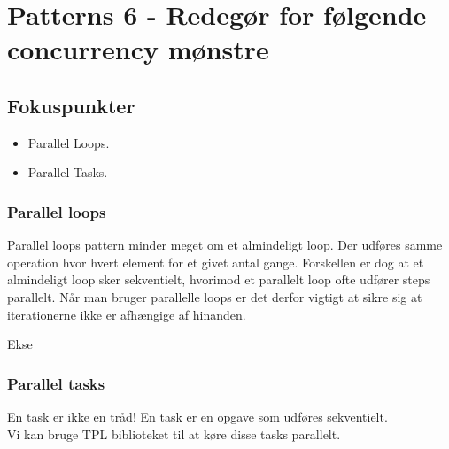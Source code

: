 \section{Patterns 6 - Redegør for følgende concurrency mønstre}

\subsection{Fokuspunkter}

\begin{itemize}
	\item Parallel Loops.
	\item Parallel Tasks.
\end{itemize}

\subsubsection{Parallel loops}

Parallel loops pattern minder meget om et almindeligt loop. Der udføres samme operation hvor hvert element for et givet antal gange. Forskellen er dog at et almindeligt loop sker sekventielt, hvorimod et parallelt loop ofte udfører steps parallelt. Når man bruger parallelle loops er det derfor vigtigt at sikre sig at iterationerne ikke er afhængige af hinanden.

Ekse

\subsubsection{Parallel tasks}

En task er ikke en tråd! En task er en opgave som udføres sekventielt.\\

Vi kan bruge TPL biblioteket til at køre disse tasks parallelt.